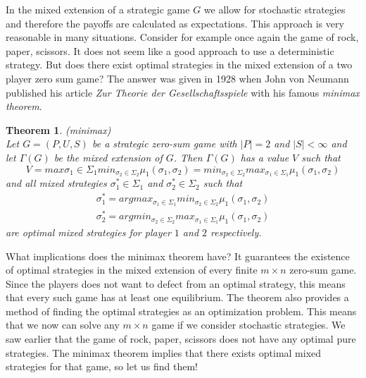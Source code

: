 \documentclass{article}
\newtheorem{theorem}{Theorem}[section]
\theoremstyle{definition}
\theoremstyle{remark}
\begin{document}
In the mixed extension of a strategic game $G$ we allow for stochastic
strategies and therefore the payoffs are calculated as
expectations. This approach is very reasonable in many
situations. Consider for example once again the game of rock, paper, scissors. It does not seem like a good approach to use a deterministic
strategy. But does there exist optimal strategies in the mixed
extension of a two player zero sum game? The answer was given in 1928
when John von Neumann published his article \emph{Zur Theorie der
  Gesellschaftsspiele} with his famous \emph{minimax theorem}.

\begin{theorem}(minimax)\\
Let $G = (P,U,S)$ be a strategic zero-sum game with $|P| = 2$ and $|S|
< \infty$ and let $\Gamma (G)$ be the mixed extension of $G$. Then
$\Gamma (G)$ has a value $V$ such that
\begin{equation}
  V = max{\sigma _1 \in
  \Sigma_1} min_{\sigma _2 \in \Sigma_2} \mu_1(\sigma_1,\sigma_2) = min_{\sigma _2 \in
  \Sigma_2} max_{\sigma _1 \in \Sigma_1} \mu_1(\sigma_1,\sigma_2)
\end{equation}
and all mixed strategies $\sigma _1^* \in \Sigma_1$ and $\sigma _2^*
\in \Sigma_2$ such that
\begin{equation}
  \begin{gathered}
\sigma_1^* = argmax_{\sigma _1 \in
  \Sigma_1} min_{\sigma _2 \in \Sigma_2} \mu_1(\sigma_1,\sigma_2)\\
 \sigma_2^* = argmin_{\sigma _2 \in \Sigma_2} max_{\sigma _1 \in
   \Sigma_1} \mu_1(\sigma_1,\sigma_2)
\end{gathered}
\end{equation}
 are optimal mixed strategies for player $1$ and $2$ respectively.
\end{theorem}

What implications does the minimax theorem have? It guarantees the
existence of optimal strategies in the mixed extension of every finite
$m\times n$ zero-sum game. Since the players does not want to defect
from an optimal strategy, this means that every such game has at least
one equilibrium. The theorem also provides a method of finding the
optimal strategies as an optimization problem. This means that we now
can solve any $m\times n$ game if we consider stochastic strategies. We
saw earlier that the game of rock, paper, scissors does not have any
optimal pure strategies. The minimax theorem implies that there exists
optimal mixed strategies for that game, so let us find them!\\
\end{document}
